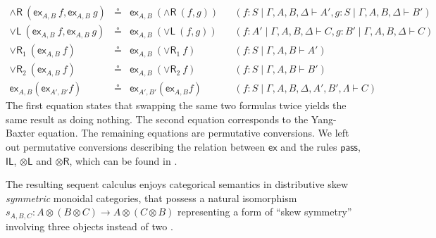 \documentclass[submission,copyright,creativecommons]{eptcs}
\theoremstyle{definition}
\newcommand{\tl}{\otimes \mathsf{L}}
\newcommand{\tr}{\otimes \mathsf{R}}
\newcommand{\pass}{\mathsf{pass}}
\newcommand{\unitl}{\mathsf{IL}}
\newcommand{\andr}{\land \mathsf{R}}
\newcommand{\orl}{\lor \mathsf{L}}
\newcommand{\orrone}{\lor \mathsf{R}_{1}}
\newcommand{\orrtwo}{\lor \mathsf{R}_{2}}
\newcommand{\ot}{\otimes}
\newcommand{\ex}{\mathsf{ex}}
\begin{document}
\begin{equation*}
\begin{array}{rclll}
  \\
  \andr \ (\ex_{A , B} \ f , \ex_{A , B} \ g) &\circeq &\ex_{A , B} \ (\andr \ (f , g)) &&(f : S \mid \Gamma , A , B , \Delta \vdash A' , g : S \mid \Gamma , A , B , \Delta \vdash B')
  \\
  \orl \ (\ex_{A , B} \ f , \ex_{A , B} \ g) &\circeq &\ex_{A , B} \ (\orl \ (f , g)) &&(f : A' \mid \Gamma , A , B , \Delta \vdash C ,  g : B' \mid \Gamma , A , B , \Delta \vdash C)
  \\
  \orrone \ (\ex_{A , B} \ f) &\circeq &\ex_{A , B} \ (\orrone \ f) &&(f : S \mid \Gamma , A , B \vdash A')
  \\
  \orrtwo \ (\ex_{A , B} \ f) &\circeq &\ex_{A , B} \ (\orrtwo \ f) &&(f : S \mid \Gamma , A , B \vdash B')
  \\
  \ex_{A , B}  (\ex_{A' , B'}  f) &\circeq & \ex_{A' , B'}  (\ex_{A , B}  f) &&(f: S \mid \Gamma , A , B , \Delta , A' , B' , \Lambda \vdash C)
\end{array}
\end{equation*}
The first equation states that swapping the same two formulas twice yields the same result as doing nothing.
The second equation corresponds to the Yang-Baxter equation.
The remaining equations are permutative conversions.
We left out permutative conversions describing the relation between $\ex$ and the rules $\pass$, $\unitl$, $\tl$ and $\tr$, which can be found in \cite[Fig. 2]{veltri:coherence:2021}.

The resulting sequent calculus enjoys categorical semantics in distributive skew \emph{symmetric} monoidal categories, that possess a natural isomorphism $s_{A , B , C} : A \ot (B \ot C) \to A \ot (C \ot B)$ representing a form of ``skew symmetry''  involving three objects instead of two \cite{bourke:lack:braided:2020}.
\end{document}
